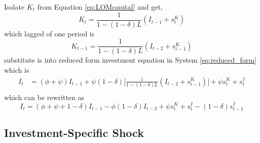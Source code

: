 \documentclass{article}
\begin{document}
Isolate $K_t$ from Equation \ref{eq:LOMcapital} and get,
$$
K_t = \frac{1}{1 - (1 - \delta)L}(I_{t-1} + s_t^K)
$$
which lagged of one period is
$$
K_{t-1} = \frac{1}{1 - (1 - \delta)L}(I_{t-2} + s_{t-1}^K)
$$
substitute is into reduced form investment equation in System \ref{eq:reduced_form} which is
\begin{equation*}
\begin{aligned}
I_t &= ( \phi + \psi) I_{t-1} + \psi (1 - \delta) \bigg[  \frac{1}{1 - (1 - \delta)L}(I_{t-2} + s_{t-1}^K) \bigg] + \psi s_t^K + s_t^I \\
\end{aligned}
\end{equation*}
which can be rewritten as
\begin{equation*}
I_t = ( \phi + \psi + 1 - \delta) I_{t-1} - \phi (1 - \delta) I_{t-2} + \psi s_{t}^K  + s_t^I  - (1 - \delta) s_{t-1}^I
\end{equation*}


\subsection{Investment-Specific Shock}
\end{document}
